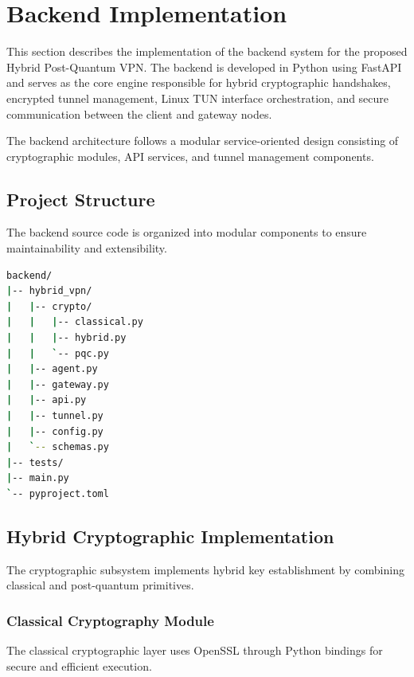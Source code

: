 \section{Backend Implementation}
\label{sec:backend_implementation}

This section describes the implementation of the backend system for the proposed Hybrid Post-Quantum VPN. The backend is developed in Python using FastAPI and serves as the core engine responsible for hybrid cryptographic handshakes, encrypted tunnel management, Linux TUN interface orchestration, and secure communication between the client and gateway nodes.

The backend architecture follows a modular service-oriented design consisting of cryptographic modules, API services, and tunnel management components.

\subsection{Project Structure}
\label{subsec:project_structure}

The backend source code is organized into modular components to ensure maintainability and extensibility.

\begin{lstlisting}[language=bash, caption={Backend Project Structure}]
backend/
|-- hybrid_vpn/
|   |-- crypto/
|   |   |-- classical.py
|   |   |-- hybrid.py
|   |   `-- pqc.py
|   |-- agent.py
|   |-- gateway.py
|   |-- api.py
|   |-- tunnel.py
|   |-- config.py
|   `-- schemas.py
|-- tests/
|-- main.py
`-- pyproject.toml
\end{lstlisting}

\subsection{Hybrid Cryptographic Implementation}
\label{subsec:crypto_implementation}

The cryptographic subsystem implements hybrid key establishment by combining classical and post-quantum primitives.

\subsubsection{Classical Cryptography Module}

The classical cryptographic layer uses OpenSSL through Python bindings for secure and efficient execution.

